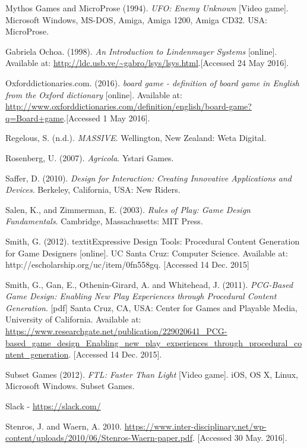 \documentclass[a4paper,11pt]{report}
\begin{document}
\begin{thebibliography}{1}
Mythos Games and MicroProse (1994). \textit{UFO: Enemy Unknown} [Video game]. Microsoft Windows, MS-DOS, Amiga, Amiga 1200, Amiga CD32. USA: MicroProse.

Gabriela Ochoa. (1998). \textit{An Introduction to Lindenmayer Systems} [online]. Available at:  \url{http://ldc.usb.ve/~gabro/lsys/lsys.html}.[Accessed 24 May 2016].

Oxforddictionaries.com. (2016). \textit{board game - definition of board game in English from the Oxford dictionary} [online]. Available at:  \url{http://www.oxforddictionaries.com/definition/english/board-game?q=Board+game}.[Accessed 1 May 2016].

Regelous, S. (n.d.). \textit{MASSIVE}. Wellington, New Zealand: Weta Digital.

Rosenberg, U. (2007). \textit{Agricola}. Ystari Games.

Saffer, D. (2010). \textit{Design for Interaction: Creating Innovative Applications and Devices}. Berkeley, California, USA: New Riders.

Salen, K., and Zimmerman, E. (2003). \textit{Rules of Play: Game Design Fundamentals}. Cambridge, Massachusetts: MIT Press.

Smith, G. (2012). textit{Expressive Design Tools: Procedural Content Generation for Game Designers} [online]. UC Santa Cruz: Computer Science. Available at: http://escholarship.org/uc/item/0fn558gq. [Accessed 14 Dec. 2015]

Smith, G., Gan, E., Othenin-Girard, A. and Whitehead, J. (2011). \textit{PCG-Based Game Design: Enabling New Play Experiences through Procedural Content Generation}. [pdf] Santa Cruz, CA, USA: Center for Games and Playable Media, University of California. Available at: \url{https://www.researchgate.net/publication/229020641_PCG-based_game_design_Enabling_new_play_experiences_through_procedural_content_generation}. [Accessed 14 Dec. 2015].

Subset Games (2012). \textit{FTL: Faster Than Light} [Video game]. iOS, OS X, Linux, Microsoft Windows. Subset Games.

Slack - \url{https://slack.com/}

Stenros, J. and Waern, A. 2010. \url{https://www.inter-disciplinary.net/wp-content/uploads/2010/06/Stenros-Waern-paper.pdf}. [Accessed 30 May. 2016].


\end{thebibliography}
\end{document}
